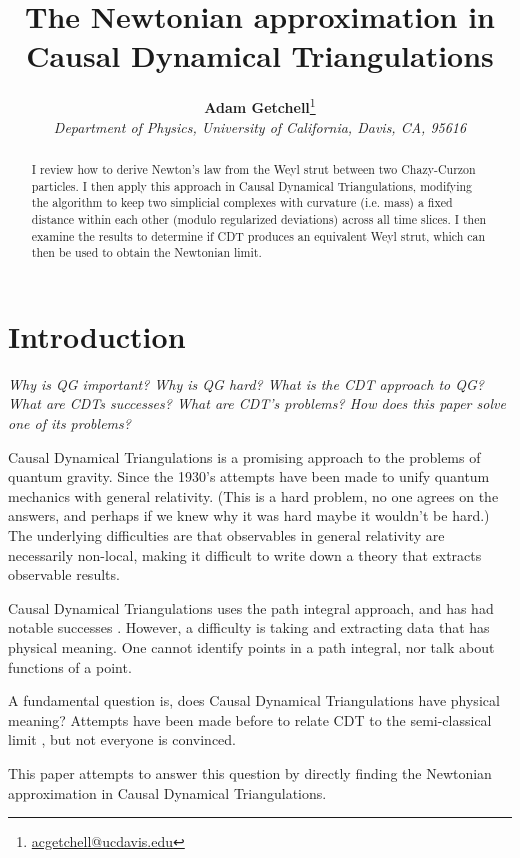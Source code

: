 \documentclass[12pt]{article}
\title{The Newtonian approximation in Causal Dynamical Triangulations}
\author{\textbf{Adam Getchell}\footnote{\href{mailto:acgetchell@ucdavis.edu}{acgetchell@ucdavis.edu}}\\\textit{Department of Physics, University of California, Davis, CA, 95616}}
\begin{document}
\maketitle

\begin{abstract}
I review how to derive Newton's law from the Weyl strut between two Chazy-Curzon particles. I then apply this approach in Causal Dynamical Triangulations, modifying the algorithm to keep two simplicial complexes with curvature (i.e. mass) a fixed distance within each other (modulo regularized deviations) across all time slices. I then examine the results to determine if CDT produces an equivalent Weyl strut, which can then be used to obtain the Newtonian limit.
\end{abstract}

\section{Introduction}

\textit{Why is QG important? Why is QG hard? What is the CDT approach to QG? What are CDTs successes? What are CDT's problems? How does this paper solve one of its problems?}

Causal Dynamical Triangulations \cite{cdt} is a promising approach to the problems of quantum gravity. Since the 1930's \cite{rovelli_notes_2000} attempts have been made to unify quantum mechanics with general relativity. (This is a hard problem, no one agrees on the answers, and perhaps if we knew why it was hard maybe it wouldn't be hard.) The underlying difficulties are that observables in general relativity are necessarily non-local, making it difficult to write down a theory that extracts observable results.

Causal Dynamical Triangulations uses the path integral approach, and has had notable successes \cite{kommu_validation_2011}. However, a difficulty is taking and extracting data that has physical meaning. One cannot identify points in a path integral, nor talk about functions of a point.

A fundamental question is, does Causal Dynamical Triangulations have physical meaning? Attempts have been made before to relate CDT to the semi-classical limit \cite{ambjorn_semiclassical_2011,ambjorn_semiclassical}, but not everyone is convinced.

This paper attempts to answer this question by directly finding the Newtonian approximation in Causal Dynamical Triangulations.
\end{document}
